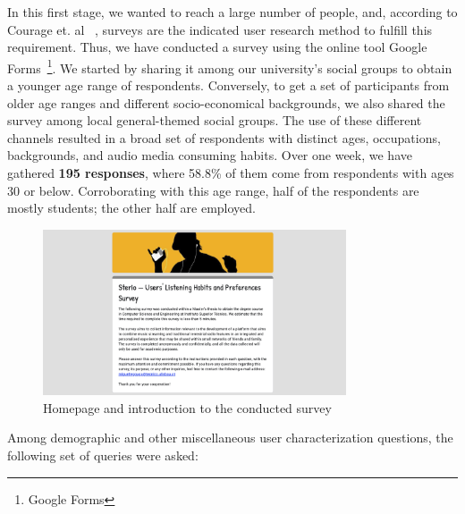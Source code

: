 In this first stage, we wanted to reach a large number of people, and, according to Courage et. al ~\cite{Courage2005}, surveys are the indicated user research method to fulfill this requirement. Thus, we have conducted a survey using the online tool Google Forms~\footnote{Google Forms}. We started by sharing it among our university’s social groups to obtain a younger age range of respondents. Conversely, to get a set of participants from older age ranges and different socio-economical backgrounds, we also shared the survey among local general-themed social groups. The use of these different channels resulted in a broad set of respondents with distinct ages, occupations, backgrounds, and audio media consuming habits. Over one week, we have gathered \textbf{195 responses}, where 58.8\% of them come from respondents with ages 30 or below. Corroborating with this age range, half of the respondents are mostly students; the other half are employed.


\begin{figure}[h]
\centering
\includegraphics[width=0.8\textwidth]{./Images/survey.png}
\caption{Homepage and introduction to the conducted survey}
\label{fig:test_env}
\end{figure}

Among demographic and other miscellaneous user characterization questions, the following set of queries were asked:

